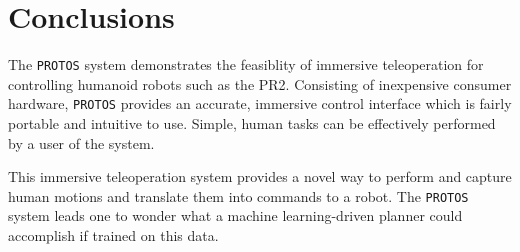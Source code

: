 \documentclass{sig-alternate}
\begin{document}
\section{Conclusions}
\label{sec:conclusions}
\indent The {\tt PROTOS} system demonstrates the feasiblity of immersive teleoperation for controlling humanoid robots such as the PR2. 
Consisting of inexpensive consumer hardware, {\tt PROTOS}
provides an accurate, immersive control interface which is fairly 
portable and intuitive to use. Simple, human tasks can be effectively performed by a user of the system. 

\indent This immersive teleoperation system provides a novel way to perform and capture human motions and
translate them into commands to a robot. The {\tt PROTOS} system leads one to wonder what a machine learning-driven planner could accomplish if trained
on this data.
\end{document}
